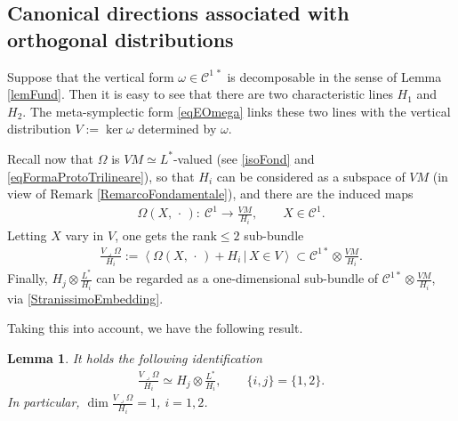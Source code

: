 \documentclass[pdftex]{sigma}
\newcommand{\C}{\mathcal{C}}
\newcommand{\Span}[1]{\left\langle #1 \right\rangle}
\newcommand{\elle}{H}
\numberwithin{equation}{section}
\newtheorem{Lemma}[Theorem]{Lemma}
\begin{document}
\subsection{Canonical directions associated with orthogonal distributions}

Suppose that the vertical form $\omega\in \C^{1\,\ast}$ is decomposable in the sense of Lemma \ref{lemFund}. Then it is easy to see that there are two characteristic lines $\elle_1$ and $\elle_2$.
The meta-symplectic form \eqref{eqEOmega} links these two lines with the vertical distribution $V:=\ker\omega$ determined by $\omega$.

Recall now that $\Omega$ is $VM\simeq L^*$-valued (see \eqref{isoFond} and \eqref{eqFormaProtoTrilineare}), so that $H_i$ can be considered as a subspace of $VM$ (in view of Remark \ref{RemarcoFondamentale}), and there are the induced maps
\begin{gather*}
 \Omega(X,\,\cdot\, )\colon \ \C^1\longrightarrow \frac{VM}{H_i} ,\qquad X\in\C^1 .
\end{gather*}
Letting $X$ vary in $V$, one gets the rank$\leq 2$ sub-bundle
\begin{gather*}
\frac{V\lrcorner \Omega}{H_i}:=\Span{ \Omega(X,\,\cdot\, )+ H_i\,|\, X\in V }\subset \C^{1\ast}\otimes \frac{VM}{H_i} .
\end{gather*}
Finally, $\elle_j\otimes\frac{L^\ast}{\elle_i}$ can be regarded as a one-dimensional sub-bundle of $\C^{1\ast}\otimes \frac{VM}{H_i}$, via \eqref{StranissimoEmbedding}.

Taking this into account, we have the following result.

\begin{Lemma}\label{lemma.strano}It holds the following identification
\begin{gather*}
 \frac{V\lrcorner \Omega}{\elle_i}\simeq\elle_j\otimes\frac{L^\ast}{\elle_i},\qquad \{i,j\}=\{1,2\}.
\end{gather*}
In particular,
$\dim\frac{V\lrcorner \Omega}{\elle_i}=1$, $ i=1,2$.
\end{Lemma}
\end{document}
